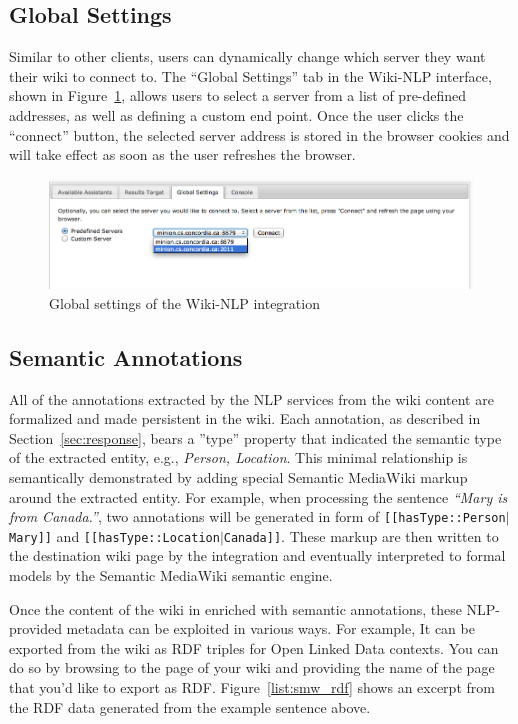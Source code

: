 \subsection{Global Settings}
Similar to other \sa clients, users can dynamically change which \sa server they want their wiki to connect to. The ``Global Settings'' tab in the Wiki-NLP interface, shown in Figure~\ref{fig:semassist_settings}, allows users to select a \sa server from a list of pre-defined addresses, as well as defining a custom end point. Once the user clicks the ``connect'' button, the selected server address is stored in the browser cookies and will take effect as soon as the user refreshes the browser.

\begin{figure}[h!]
\centering
\includegraphics[width=\textwidth]{pictures/semassist_settings.png}
\caption{Global settings of the Wiki-NLP integration}
\label{fig:semassist_settings}
\end{figure}

\subsection{Semantic Annotations}
All of the annotations extracted by the NLP services from the wiki content are formalized and made persistent in the wiki. Each annotation, as described in Section~\ref{sec:response}, bears a ''type'' property that indicated the semantic type of the extracted entity, e.g., \emph{Person, Location}. This minimal relationship is semantically demonstrated by adding special Semantic MediaWiki markup around the extracted entity. For example, when processing the sentence \emph{``Mary is from Canada.''}, two annotations will be generated in form of \texttt{[[hasType::Person$|$Mary]]} and \texttt{[[hasType::Location$|$Canada]]}. These markup are then written to the destination wiki page by the integration and eventually interpreted to formal models by the Semantic MediaWiki semantic engine.

Once the content of the wiki in enriched with semantic annotations, these NLP-provided metadata can be exploited in various ways. For example, It can be exported from the wiki as RDF triples for Open Linked Data contexts. You can do so by browsing to the  page of your wiki and providing the name of the page that you'd like to export as RDF. Figure~\ref{list:smw_rdf} shows an excerpt from the RDF data generated from the example sentence above.

